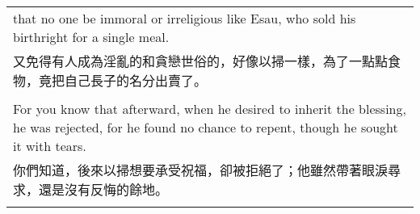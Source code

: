 \begin{tabularx}{\textwidth}{p{}}
that no one be immoral or irreligious like Esau, who sold his birthright for a single meal. \\
又免得有人成為淫亂的和貪戀世俗的，好像以掃一樣，為了一點點食物，竟把自己長子的名分出賣了。 \\ \\
For you know that afterward, when he desired to inherit the blessing, he was rejected, for he found no chance to repent, though he sought it with tears. \\
你們知道，後來以掃想要承受祝福，卻被拒絕了；他雖然帶著眼淚尋求，還是沒有反悔的餘地。 \\ \\

\hline
\end{tabularx}

\newpage

